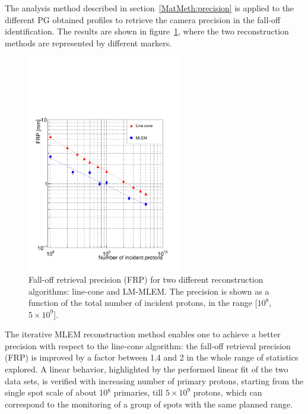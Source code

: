 The analysis method described in section~\ref{MatMeth:precision} is applied to the different PG obtained profiles to retrieve the camera precision in the fall-off identification. The results are shown in figure~\ref{fig:precision}, where the two reconstruction methods are represented by different markers.

\begin{figure}	
\centering
\includegraphics[width=0.6\textwidth]{./Figure/precision_2it.pdf}
\caption{Fall-off retrieval precision (FRP) for two different reconstruction algorithms: line-cone and LM-MLEM. The precision is shown as a function of the total number of incident protons, in the range [$10^{8}$, $5\times10^{9}$].}	
\label{fig:precision}
\end{figure}

The iterative MLEM reconstruction method enables one to achieve a better precision with respect to the line-cone algorithm: the fall-off retrieval precision (FRP) is improved by a factor between 1.4 and 2 in the whole range of statistics explored. A linear behavior, highlighted by the performed linear fit of the two data sets, is verified with increasing number of primary protons, starting from the single spot scale of about 10$^8$ primaries, till $5\times10^9$ protons, which can correspond to the monitoring of a group of spots with the same planned range. 

